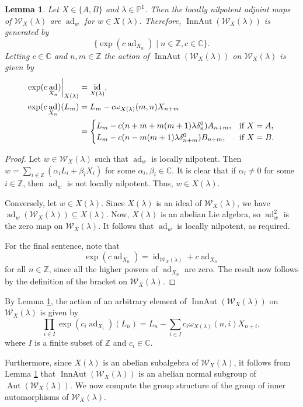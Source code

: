 \documentclass[11pt, svgnames]{amsart}
\DeclareMathOperator{\ad}{ad}
\newcommand{\ZZ}{\mathbb{Z}}
\newcommand{\CC}{\mathbb{C}}
\newcommand{\PP}{\mathbb{P}}
\newcommand{\W}{\mathcal{W}}
\DeclareMathOperator{\id}{id}
\DeclareMathOperator{\Aut}{Aut}
\DeclareMathOperator{\InnAut}{InnAut}
\newcommand\restr[2]{{
  \left.\kern-\nulldelimiterspace %
  #1 %
  \vphantom{\big|}
  \right|_{#2}
  }}
\newtheorem{lemma}[proposition]{Lemma}
\theoremstyle{definition}
\begin{document}
\begin{lemma}\label{lem:inner automorphisms}
    Let $X \in \{A,B\}$ and $\lambda \in \PP^1$. Then the locally nilpotent adjoint maps of $\W_X(\lambda)$ are $\ad_w$ for $w \in X(\lambda)$. Therefore, $\InnAut(\W_X(\lambda))$ is generated by
    $$\{\exp(c \ad_{X_n}) \mid n \in \ZZ, c \in \CC\}.$$
    Letting $c \in \CC$ and $n,m \in \ZZ$ the action of $\InnAut(\W_X(\lambda))$ on $\W_X(\lambda)$ is given by
    \begin{align*}
        \restr{\exp(c\ad_{X_n})}{X(\lambda)} &= \id_{X(\lambda)}, \\
        \exp(c\ad_{X_n})(L_m) &= L_m - c\omega_{X(\lambda)}(m,n)X_{n+m} \\
        &= \begin{cases}
            L_m - c(n + m + m(m + 1)\lambda \delta_n^0)A_{n+m}, &\text{if } X = A,\\
            L_m - c(n - m(m + 1)\lambda \delta_{n+m}^0)B_{n+m}, &\text{if } X = B.
        \end{cases}
    \end{align*}
\end{lemma}
\begin{proof}
    Let $w \in \W_X(\lambda)$ such that $\ad_w$ is locally nilpotent. Then $w = \sum_{i \in \ZZ} (\alpha_i L_i + \beta_i X_i)$ for some $\alpha_i, \beta_i \in \CC$. It is clear that if $\alpha_i \neq 0$ for some $i \in \ZZ$, then $\ad_w$ is not locally nilpotent. Thus, $w \in X(\lambda)$.
    
    Conversely, let $w \in X(\lambda)$. Since $X(\lambda)$ is an ideal of $\W_X(\lambda)$, we have $\ad_w(\W_X(\lambda)) \subseteq X(\lambda)$. Now, $X(\lambda)$ is an abelian Lie algebra, so $\ad_w^2$ is the zero map on $\W_X(\lambda)$. It follows that $\ad_w$ is locally nilpotent, as required.

    For the final sentence, note that
    $$\exp(c \ad_{X_n}) = \id_{\W_X(\lambda)} + c \ad_{X_n}$$
    for all $n \in \ZZ$, since all the higher powers of $\ad_{X_n}$ are zero. The result now follows by the definition of the bracket on $\W_X(\lambda)$.
\end{proof}

By Lemma \ref{lem:inner automorphisms}, the action of an arbitrary element of $\InnAut(\W_X(\lambda))$ on $\W_X(\lambda)$ is given by
$$\prod_{i \in I}\exp(c_i\ad_{X_i})(L_n) = L_n - \sum_{i \in I} c_i\omega_{X(\lambda)}(n,i)X_{n+i},$$
where $I$ is a finite subset of $\ZZ$ and $c_i \in \CC$.

Furthermore, since $X(\lambda)$ is an abelian subalgebra of $\W_X(\lambda)$, it follows from Lemma \ref{lem:inner automorphisms} that $\InnAut(\W_X(\lambda))$ is an abelian normal subgroup of $\Aut(\W_X(\lambda))$. We now compute the group structure of the group of inner automorphisms of $\W_X(\lambda)$.
\end{document}
